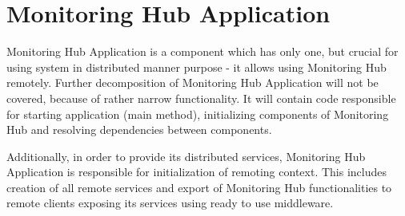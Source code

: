 %
\section{Monitoring Hub Application}
\label{sec:arch_monitoring_hub_application}

Monitoring Hub Application is a component which has only one, but crucial for using system in distributed manner purpose - it allows using Monitoring Hub remotely. Further decomposition of Monitoring Hub Application will not be covered, because of rather narrow functionality. It will contain code responsible for starting application (main method), initializing components of Monitoring Hub and resolving dependencies between components.

Additionally, in order to provide its distributed services, Monitoring Hub Application is responsible for initialization of remoting context. This includes creation of all remote services and export of Monitoring Hub functionalities to remote clients exposing its services using ready to use middleware.

